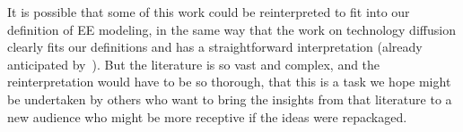 It is possible that some of this work could be reinterpreted to fit into our definition of EE modeling, in the same way that the work on technology diffusion
clearly fits our definitions and has a straightforward interpretation (already anticipated by~\cite{arrow_classificatory_1969}).  But the literature is so vast and complex, and the reinterpretation would have to be so thorough, that this is a task we hope might be undertaken by others who want to bring the insights from that literature to a new audience who might be more receptive if the ideas were repackaged.
\begin{comment}
\begin{itemize}

	\item
	bank runs/spread of panic and fear

	\begin{itemize}
		\item
		canonical models are basically timeless: run happens instantly
		\href{https://www.jstor.org/stable/1837095}{\cite{diamond_bank_1983}}
		\item also,  the run arises as one of the multi-equilibra
		\item
		in reality, both the process and the outcome are likely driven by how information/fear spreads across the social network
		\begin{itemize}
			\item  the unfolding of a bank run using high-frequency data on deposits withdrawing and social network: \href{https://www.aeaweb.org/articles?id=10.1257/aer.102.4.1414}{\cite{iyer2012understanding}}
			\item runs are more likely to diffuse with similar bank/community characteristics,(suggesting infection rate is not constant in epi models);  \href{https://journals.sagepub.com/doi/abs/10.1177/0003122416629611}{\cite{greve2016ripples}};
			\item  depositors who learned from acquaintances about the bad news regarding banks first closed bank accounts; \href{https://www.aeaweb.org/articles?id=10.1257/aer.90.5.1110}{\cite{kelly2000market}}
		\end{itemize}
		\item
		financial crisis in the Great Recession has been described as
		``giant extended bank run on financial sector''
	\end{itemize}


\end{itemize}
\end{comment}
